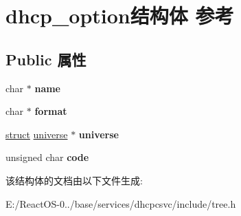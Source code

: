 \hypertarget{structdhcp__option}{}\section{dhcp\+\_\+option结构体 参考}
\label{structdhcp__option}
\subsection*{Public 属性}
\begin{DoxyCompactItemize}
\item 
\mbox{\label{structdhcp__option_ac9caee5ed37339b0bb7f843570802f8a}} 
char $\ast$ {\bfseries name}
\item 
\mbox{\label{structdhcp__option_ae71301cf6050f0d442f39a85fc913b46}} 
char $\ast$ {\bfseries format}
\item 
\mbox{\label{structdhcp__option_a0b593e8639f795159989fbf70be54e4a}} 
\hyperlink{interfacestruct}{struct} \hyperlink{structuniverse}{universe} $\ast$ {\bfseries universe}
\item 
\mbox{\label{structdhcp__option_a67e5a87234d307393ba915d57418628d}} 
unsigned char {\bfseries code}
\end{DoxyCompactItemize}


该结构体的文档由以下文件生成\+:\begin{DoxyCompactItemize}
\item 
E\+:/\+React\+O\+S-\/0../base/services/dhcpcsvc/include/tree.\+h\end{DoxyCompactItemize}
